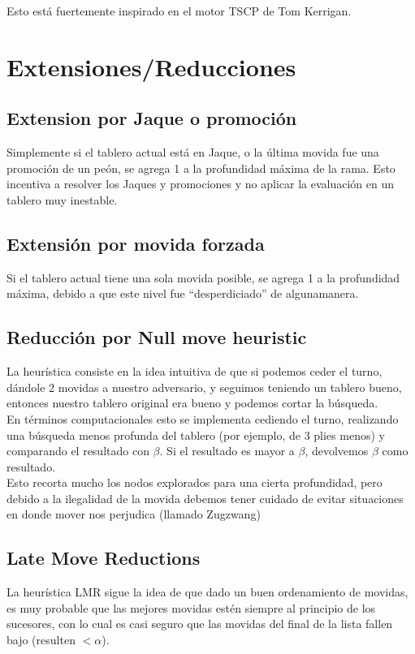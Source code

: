 \documentclass{article}
\begin{document}
Esto está fuertemente inspirado en el motor TSCP de Tom Kerrigan.

\section{Extensiones/Reducciones}

\subsection{Extension por Jaque o promoción}
Simplemente si el tablero actual está en Jaque, o la última movida fue
una promoción de un peón, se agrega 1 a la profundidad máxima de la
rama. Esto incentiva a resolver los Jaques y promociones y no aplicar la
evaluación en un tablero muy inestable.

\subsection{Extensión por movida forzada}
Si el tablero actual tiene una sola movida posible, se agrega 1 a la
profundidad máxima, debido a que este nivel fue ``desperdiciado'' de
algunamanera.

\subsection{Reducción por Null move heuristic}
La heurística consiste en la idea intuitiva de que si podemos ceder el
turno, dándole 2 movidas a nuestro adversario, y seguimos teniendo un
tablero bueno, entonces nuestro tablero original era bueno y podemos
cortar la búsqueda.
\\

En términos computacionales esto se implementa cediendo el turno, realizando
una búsqueda menos profunda del tablero (por ejemplo, de 3 plies menos) y comparando el resultado con $\beta$. Si el resultado es mayor a $\beta$, devolvemos $\beta$ como resultado.
\\

Esto recorta mucho los nodos explorados para una cierta profundidad,
pero debido a la ilegalidad de la movida debemos tener cuidado de evitar
situaciones en donde mover nos perjudica (llamado Zugzwang)
\\

\subsection{Late Move Reductions}
La heurística LMR sigue la idea de que dado un buen ordenamiento de
movidas, es muy probable que las mejores movidas estén siempre al
principio de los sucesores, con lo cual es casi seguro que las movidas
del final de la lista fallen bajo (resulten $< \alpha$).
\\
\end{document}
